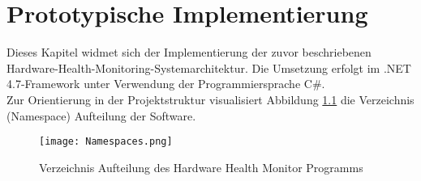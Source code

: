 \newpage
\chapter{Prototypische Implementierung}
Dieses Kapitel widmet sich der Implementierung der zuvor beschriebenen Hardware-Health-Monitoring-Systemarchitektur. Die Umsetzung erfolgt im .NET 4.7-Framework unter Verwendung der Programmiersprache C\#.\\
Zur Orientierung in der Projektstruktur visualisiert Abbildung \ref{fig:Namespaces} die Verzeichnis (Namespace) Aufteilung der Software.  
\begin{center}
    \begin{figure}[h!]
        \centering
        \texttt{[image: Namespaces.png]}
        \caption{Verzeichnis Aufteilung des Hardware Health Monitor Programms}
        \label{fig:Namespaces}
    \end{figure}
\end{center}
